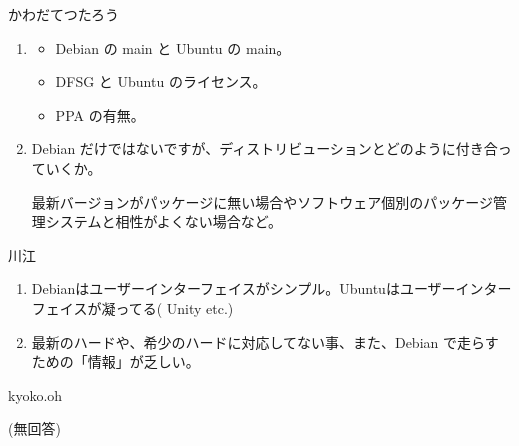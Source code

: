 \documentclass[mingoth,a4paper]{jsarticle}
\begin{document}
\begin{prework}{ かわだてつたろう }
  \begin{enumerate}
  \item
    \begin{itemize}
    \item Debian の main と Ubuntu の main。
    \item DFSG と Ubuntu のライセンス。
    \item PPA の有無。
    \end{itemize}
  \item Debian だけではないですが、ディストリビューションとどのように付き合っていくか。

    最新バージョンがパッケージに無い場合やソフトウェア個別のパッケージ管理システムと相性がよくない場合など。
  \end{enumerate}
\end{prework}

\begin{prework}{ 川江 }
  \begin{enumerate}
  \item Debianはユーザーインターフェイスがシンプル。Ubuntuはユーザーインターフェイスが凝ってる( Unity etc.)
  \item 最新のハードや、希少のハードに対応してない事、また、Debian で走らすための「情報」が乏しい。
  \end{enumerate}
\end{prework}

\begin{prework}{ kyoko.oh }

(無回答)

\end{prework}
\end{document}
